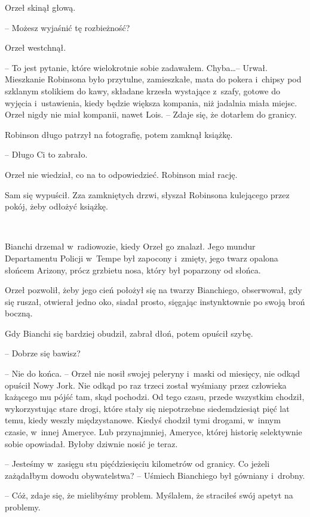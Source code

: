 \documentclass[oneside,polish,11pt,sfheadings]{mwbk}
\begin{document}
Orzeł skinął głową.

-- Możesz wyjaśnić tę rozbieżność?

Orzeł westchnął. 

-- To jest pytanie, które wielokrotnie sobie zadawałem.
Chyba\ldots  -- Urwał. Mieszkanie Robinsona było przytulne, zamieszkałe, mata
do pokera i~chipsy pod szklanym stolikiem do kawy, składane krzesła
wystające z~szafy, gotowe do wyjęcia i~ustawienia, kiedy będzie większa
kompania, niż jadalnia miała miejsc. Orzeł nigdy nie miał kompanii,
nawet Lois. -- Zdaje się, że dotarłem do granicy.

Robinson długo patrzył na fotografię, potem zamknął książkę. 

-- Długo Ci
to zabrało.

Orzeł nie wiedział, co na to odpowiedzieć. Robinson miał rację.

Sam się wypuścił. Zza zamkniętych drzwi, słyszał Robinsona kulejącego
przez pokój, żeby odłożyć książkę.

~

Bianchi drzemał w~radiowozie, kiedy Orzeł go znalazł. Jego mundur
Departamentu Policji w~Tempe był zapocony i~zmięty, jego twarz opalona
słońcem Arizony, prócz grzbietu nosa, który był poparzony od słońca.

Orzeł pozwolił, żeby jego cień położył się na twarzy Bianchiego,
obserwował, gdy się ruszał, otwierał jedno oko, siadał prosto, sięgając
instynktownie po swoją broń boczną.

Gdy Bianchi się bardziej obudził, zabrał dłoń, potem opuścił szybę.

-- Dobrze się bawisz?

-- Nie do końca. -- Orzeł nie nosił swojej peleryny i~maski od miesięcy,
nie odkąd opuścił Nowy Jork. Nie odkąd po raz trzeci został wyśmiany
przez człowieka każącego mu pójść tam, skąd pochodzi. Od tego czasu,
przede wszystkim chodził, wykorzystując stare drogi, które stały się
niepotrzebne siedemdziesiąt pięć lat temu, kiedy weszły międzystanowe.
Kiedyś chodził tymi drogami, w~innym czasie, w~innej Ameryce. Lub
przynajmniej, Ameryce, której historię selektywnie sobie opowiadał.
Byłoby dziwnie nosić je teraz.

-- Jesteśmy w~zasięgu stu pięćdziesięciu kilometrów od granicy. Co jeżeli
zażądałbym dowodu obywatelstwa? -- Uśmiech Bianchiego był gówniany i~drobny.

-- Cóż, zdaje się, że mielibyśmy problem. Myślałem, że straciłeś swój
apetyt na problemy.
\end{document}
